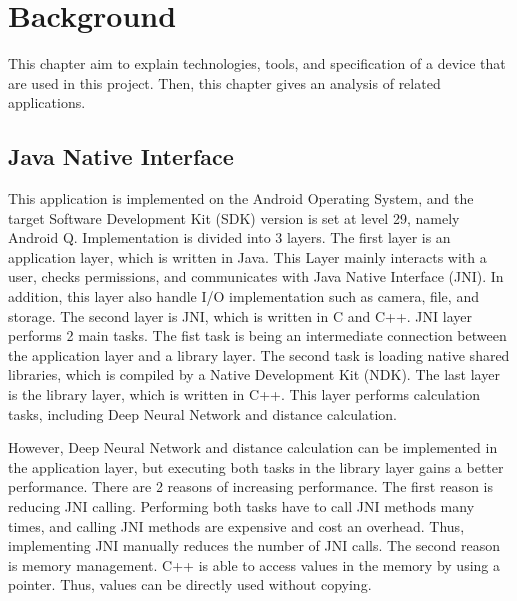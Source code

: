\chapter{Background}\label{background}

    This chapter aim to explain technologies, tools, and specification of a device that are used in this project.
    Then, this chapter gives an analysis of related applications.

    \section{Java Native Interface}
        This application is implemented on the Android Operating System, and the target Software Development Kit (SDK) version is set at level 29, namely Android Q.
        Implementation is divided into 3 layers.
            The first layer is an application layer, which is written in Java.
                This Layer mainly interacts with a user, checks permissions, and communicates with Java Native Interface (JNI).
                In addition, this layer also handle I/O implementation such as camera, file, and storage.
            The second layer is JNI, which is written in C and C++.
                JNI layer performs 2 main tasks.
                    The fist task is being an intermediate connection between the application layer and a library layer.
                    The second task is loading native shared libraries, which is compiled by a Native Development Kit (NDK).
            The last layer is the library layer, which is written in C++.
                This layer performs calculation tasks, including Deep Neural Network and distance calculation.

        However, Deep Neural Network and distance calculation can be implemented in the application layer,
        but executing both tasks in the library layer gains a better performance. There are 2 reasons of increasing performance.
            The first reason is reducing JNI calling. Performing both tasks have to call JNI methods many times, and calling JNI methods are expensive and cost an overhead.
                Thus, implementing JNI manually reduces the number of JNI calls.
            The second reason is memory management. C++ is able to access values in the memory by using a pointer.
                Thus, values can be directly used without copying.


